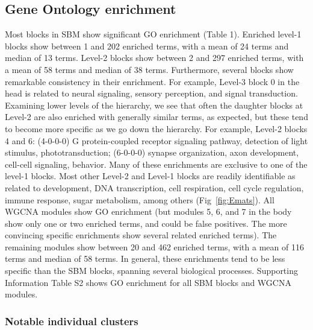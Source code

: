 \documentclass[
]{article}
\begin{document}
\subsection{Gene Ontology enrichment}\label{gene-ontology-enrichment-1}

Most blocks in SBM show significant GO enrichment (Table 1). Enriched
level-1 blocks show between 1 and 202 enriched terms, with a mean of 24
terms and median of 13 terms. Level-2 blocks show between 2 and 297
enriched terms, with a mean of 58 terms and median of 38 terms.
Furthermore, several blocks show remarkable consistency in their
enrichment. For example, Level-3 block 0 in the head is related to
neural signaling, sensory perception, and signal transduction. Examining
lower levels of the hierarchy, we see that often the daughter blocks at
Level-2 are also enriched with generally similar terms, as expected, but
these tend to become more specific as we go down the hierarchy. For
example, Level-2 blocks 4 and 6: (4-0-0-0) G protein-coupled receptor
signaling pathway, detection of light stimulus, phototransduction;
(6-0-0-0) synapse organization, axon development, cell-cell signaling,
behavior. Many of these enrichments are exclusive to one of the level-1
blocks. Most other Level-2 and Level-1 blocks are readily identifiable
as related to development, DNA transcription, cell respiration, cell
cycle regulation, immune response, sugar metabolism, among others
(Fig~\ref{fig:Emats}). All WGCNA modules show GO enrichment (but modules
5, 6, and 7 in the body show only one or two enriched terms, and could
be false positives. The more convincing specific enrichments show
several related enriched terms). The remaining modules show between 20
and 462 enriched terms, with a mean of 116 terms and median of 58 terms.
In general, these enrichments tend to be less specific than the SBM
blocks, spanning several biological processes. Supporting Information
Table S2 shows GO enrichment for all SBM blocks and WGCNA modules.

\subsubsection{Notable individual
clusters}\label{notable-individual-clusters}
\end{document}
